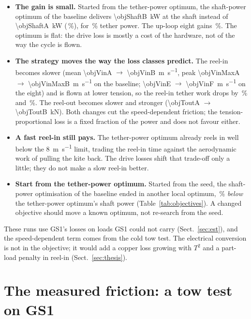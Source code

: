 \documentclass[11pt,a4paper]{article}
\begin{document}
\begin{itemize}
  \item \textbf{The gain is small.} Started from the tether-power optimum, the
    shaft-power optimum of the baseline delivers \SI{\objShaftB}{kW} at the
    shaft instead of \SI{\objShaftA}{kW} (\objShaftGainB\,\%), for
    \objTetherChangeB\,\% tether power. The up-loop eight gains
    \objShaftGainF\,\%. The optimum is flat: the drive loss is mostly a cost
    of the hardware, not of the way the cycle is flown.
  \item \textbf{The strategy moves the way the loss classes predict.} The
    reel-in becomes slower (mean \SI{\objVinA}{} $\to$
    \SI{\objVinB}{m.s^{-1}}, peak \SI{\objVinMaxA}{} $\to$
    \SI{\objVinMaxB}{m.s^{-1}} on the baseline; \SI{\objVinE}{} $\to$
    \SI{\objVinF}{m.s^{-1}} on the eight) and is flown at lower tension, so the
    reel-in tether work drops by \objEinChangeB\,\% and \objEinChangeF\,\%. The
    reel-out becomes slower and stronger (\SI{\objToutA}{} $\to$
    \SI{\objToutB}{kN}). Both changes cut the speed-dependent friction; the
    tension-proportional loss is a fixed fraction of the power and does not
    favour either.
  \item \textbf{A fast reel-in still pays.} The tether-power optimum already
    reels in well below the \SI{8}{m.s^{-1}} limit, trading the reel-in time
    against the aerodynamic work of pulling the kite back. The drive losses
    shift that trade-off only a little; they do not make a slow reel-in
    better.
  \item \textbf{Start from the tether-power optimum.} Started from the seed,
    the shaft-power optimisation of the baseline ended in another local
    optimum, \objShaftGainC\,\% \emph{below} the tether-power optimum's shaft
    power (Table~\ref{tab:objectives}). A changed objective should move a known
    optimum, not re-search from the seed.
\end{itemize}

These runs use GS1's losses on loads GS1 could not carry
(Sect.~\ref{sec:est}), and the speed-dependent term comes from the cold tow
test. The electrical conversion is not in the objective; it would add a
copper loss growing with $T^2$ and a part-load penalty in reel-in
(Sect.~\ref{sec:thesis}).

\section{The measured friction: a tow test on GS1}
\label{sec:tow}
\end{document}

